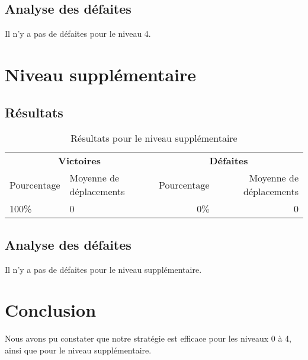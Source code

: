 \subsection{Analyse des défaites}

Il n'y a pas de défaites pour le niveau 4.

\section{Niveau supplémentaire}

\subsection{Résultats}

\begin{table}[!htpb]
    \begin{tabularx}{\textwidth}{lXrr}
        \toprule
        \multicolumn{2}{c}{\textbf{Victoires}} & \multicolumn{2}{c}{\textbf{Défaites}} \\
        \cmidrule(lr){1-2} \cmidrule(lr){3-4}
        Pourcentage & Moyenne de déplacements & Pourcentage & Moyenne de déplacements \\
        \midrule
        100\% & 0 & 0\% & 0 \\
        \bottomrule
    \end{tabularx}
    \caption{Résultats pour le niveau supplémentaire}
    \label{tab:res-niveau-supplementaire}
\end{table}

\subsection{Analyse des défaites}

Il n'y a pas de défaites pour le niveau supplémentaire.

\section{Conclusion}

Nous avons pu constater que notre stratégie est efficace pour les niveaux 0 à 4, ainsi que pour le niveau supplémentaire.